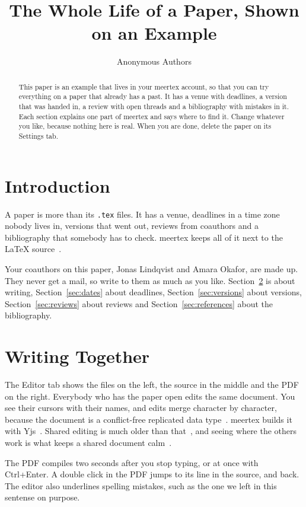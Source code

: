 \documentclass[11pt]{article}
\title{The Whole Life of a Paper, Shown on an Example}
\author{Anonymous Authors}
\date{}
\begin{document}
\maketitle

\begin{abstract}
This paper is an example that lives in your meertex account, so that you can
try everything on a paper that already has a past. It has a venue with
deadlines, a version that was handed in, a review with open threads and a
bibliography with mistakes in it. Each section explains one part of meertex
and says where to find it. Change whatever you like, because nothing here is
real. When you are done, delete the paper on its Settings tab.
\end{abstract}

\section{Introduction}\label{sec:intro}

A paper is more than its \texttt{.tex} files. It has a venue, deadlines in a
time zone nobody lives in, versions that went out, reviews from coauthors and a
bibliography that somebody has to check. meertex keeps all of it next to the
\LaTeX{} source~\cite{lamport1994latex}.

Your coauthors on this paper, Jonas Lindqvist and Amara Okafor, are made up.
They never get a mail, so write to them as much as you like.
Section~\ref{sec:writing} is about writing, Section~\ref{sec:dates} about
deadlines, Section~\ref{sec:versions} about versions,
Section~\ref{sec:reviews} about reviews and Section~\ref{sec:references} about
the bibliography.

\section{Writing Together}\label{sec:writing}

The Editor tab shows the files on the left, the source in the middle and the
PDF on the right. Everybody who has the paper open edits the same document.
You see their cursors with their names, and edits merge character by
character, because the document is a conflict-free replicated data
type~\cite{shapiro2011crdt}. meertex builds it with
Yjs~\cite{nicolaescu2016yjs,yjs}. Shared editing is much older than
that~\cite{ellis1989concurrency}, and seeing where the others work is what
keeps a shared document calm~\cite{dourish1992awareness}.

The PDF compiles two seconds after you stop typing, or at once with
Ctrl+Enter. A double click in the PDF jumps to its line in the source, and
back. The editor also underlines spelling mistakes, such as the one we left in
this sentense on purpose.
\end{document}
